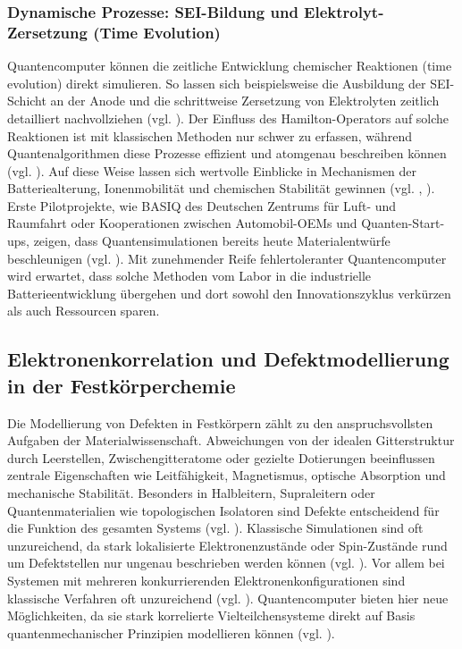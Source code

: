 \subsubsection{Dynamische Prozesse: SEI-Bildung und Elektrolyt-Zersetzung (Time Evolution)}
Quantencomputer können die zeitliche Entwicklung chemischer Reaktionen (time evolution) direkt simulieren. So lassen sich beispielsweise die Ausbildung der SEI-Schicht an der Anode und die schrittweise Zersetzung von Elektrolyten zeitlich detailliert nachvollziehen (vgl. \cite{hanaor_computational_2024}). Der Einfluss des Hamilton-Operators auf solche Reaktionen ist mit klassischen Methoden nur schwer zu erfassen, während Quantenalgorithmen diese Prozesse effizient und atomgenau beschreiben können (vgl. \cite{weidman_quantum_2024}). Auf diese Weise lassen sich wertvolle Einblicke in Mechanismen der Batteriealterung, Ionenmobilität und chemischen Stabilität gewinnen (vgl. \cite{hanaor_computational_2024}, \cite{weidman_quantum_2024}).
\newline\\
Erste Pilotprojekte, wie BASIQ des Deutschen Zentrums für Luft- und Raumfahrt oder Kooperationen zwischen Automobil-OEMs und Quanten-Start-ups, zeigen, dass Quantensimulationen bereits heute Materialentwürfe beschleunigen (vgl. \cite{kaysser-pyzalla_dlr_nodate}). Mit zunehmender Reife fehlertoleranter Quantencomputer wird erwartet, dass solche Methoden vom Labor in die industrielle Batterieentwicklung übergehen und dort sowohl den Innovationszyklus verkürzen als auch Ressourcen sparen.

\subsection{Elektronenkorrelation und Defektmodellierung in der Festkörperchemie}
\label{Chemie_Elektronenkorrelation}
Die Modellierung von Defekten in Festkörpern zählt zu den anspruchsvollsten Aufgaben der Materialwissenschaft. Abweichungen von der idealen Gitterstruktur durch Leerstellen, Zwischengitteratome oder gezielte Dotierungen beeinflussen zentrale Eigenschaften wie Leitfähigkeit, Magnetismus, optische Absorption und mechanische Stabilität. Besonders in Halbleitern, Supraleitern oder Quantenmaterialien wie topologischen Isolatoren sind Defekte entscheidend für die Funktion des gesamten Systems (vgl. \cite{bassett_quantum_2019}).
Klassische Simulationen sind oft unzureichend, da stark lokalisierte Elektronenzustände oder Spin-Zustände rund um Defektstellen nur ungenau beschrieben werden können (vgl. \cite{bauer_quantum_2020}). Vor allem bei Systemen mit mehreren konkurrierenden Elektronenkonfigurationen sind klassische Verfahren oft unzureichend (vgl. \cite{bassett_quantum_2019}).
Quantencomputer bieten hier neue Möglichkeiten, da sie stark korrelierte Vielteilchensysteme direkt auf Basis quantenmechanischer Prinzipien modellieren können (vgl. \cite{daley_practical_2022}).

